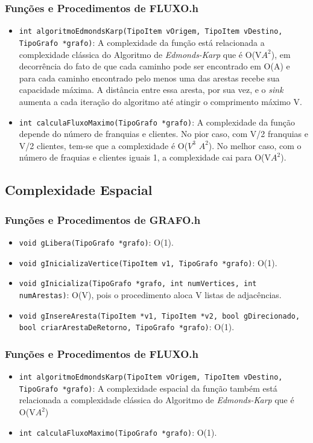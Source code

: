 \documentclass[
    12pt,               %
    a4paper,            %
    oneside,
    english,            %
    french,             %
    spanish,            %
    brazil              %
    ]{abntex2}
\begin{document}
\subsubsection*{Funções e Procedimentos de FLUXO.h}
\begin{itemize}

	\item \texttt{int algoritmoEdmondsKarp(TipoItem vOrigem, TipoItem vDestino, 	 TipoGrafo *grafo)}:
	A complexidade da função está relacionada a complexidade clássica do Algoritmo de \textit{Edmonds-Karp} que é O(V$A^2$), em decorrência do fato de que cada caminho pode ser encontrado em O(A) e para cada caminho encontrado pelo menos uma das arestas recebe sua capacidade máxima. A distância entre essa aresta, por sua vez, e o \textit{sink} aumenta a cada iteração do algoritmo até atingir o comprimento máximo V.
	\item \texttt{int calculaFluxoMaximo(TipoGrafo *grafo)}:
	A complexidade da função depende do número de franquias e clientes. No pior caso, com V/2 franquias e V/2 clientes, tem-se que a complexidade é O($V^3$ $A^2$). No melhor caso, com o número de fraquias e clientes iguais 1, a complexidade cai para O(V$A^2$).	
		
\end{itemize}

\subsection*{Complexidade Espacial}
\subsubsection*{Funções e Procedimentos de GRAFO.h}
\begin{itemize}

	\item \texttt{void gLibera(TipoGrafo *grafo)}:
	O(1).	
	\item \texttt{void gInicializaVertice(TipoItem v1, TipoGrafo *grafo)}:
	O(1).	
	\item \texttt{void gInicializa(TipoGrafo *grafo, int numVertices, int  numArestas)}:
	O(V), pois o procedimento aloca V listas de adjacências.	
	\item \texttt{void gInsereAresta(TipoItem *v1, TipoItem *v2, bool gDirecionado, bool   		  criarArestaDeRetorno, TipoGrafo *grafo)}:
	O(1).
	
\end{itemize}

\subsubsection*{Funções e Procedimentos de FLUXO.h}
\begin{itemize}

	\item \texttt{int algoritmoEdmondsKarp(TipoItem vOrigem, TipoItem vDestino, 	 TipoGrafo *grafo)}:
	A complexidade espacial da função também está relacionada a complexidade clássica do Algoritmo de \textit{Edmonds-Karp} que é O(V$A^2$)
	\item \texttt{int calculaFluxoMaximo(TipoGrafo *grafo)}:
	O(1).	
		
\end{itemize}
\end{document}
